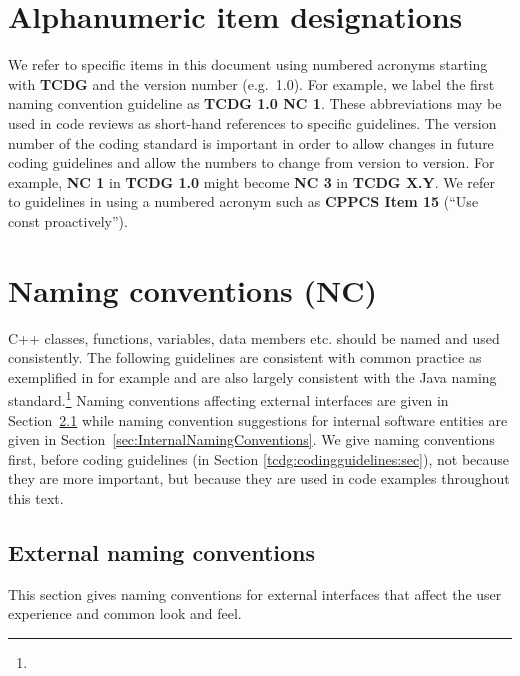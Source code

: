 %
\section{Alphanumeric item designations}
\label{sec:alpha_numeric_designations}
%

We refer to specific items in this document using numbered acronyms
starting with \textbf{TCDG} and the version number (e.g.\ 1.0).  For
example, we label the first naming convention guideline as
\textbf{TCDG 1.0 NC 1}.  These abbreviations may be used in code
reviews as short-hand references to specific guidelines.  The version
number of the coding standard is important in order to allow changes
in future coding guidelines and allow the numbers to change from
version to version.  For example, \textbf{NC 1} in \textbf{TCDG
  1.0} might become \textbf{NC 3} in \textbf{TCDG X.Y}.  We refer
to guidelines in \cite{C++CodingStandards05} using a numbered
acronym such as \textbf{CPPCS Item 15} (``Use const proactively'').

%
\section{Naming conventions (NC)}
\label{sec:NamingConventions}
%

C++ classes, functions, variables, data members etc. should be named
and used consistently.  The following guidelines are consistent with
common practice as exemplified in {}\cite{EffectiveC++3rd05} for
example and are also largely consistent with the Java naming
standard.\footnote{
  {}}
Naming conventions affecting external interfaces are given in
Section~\ref{sec:ExternalNamingConventions} while naming convention
suggestions for internal software entities are given in
Section~\ref{sec:InternalNamingConventions}.  We give naming
conventions first, before coding guidelines (in Section
\ref{tcdg:codingguidelines:sec}), not because they are more important,
but because they are used in code examples throughout this text.


%
\subsection{External naming conventions}
\label{sec:ExternalNamingConventions}
%

This section gives naming conventions for external interfaces that
affect the user experience and common look and feel.

